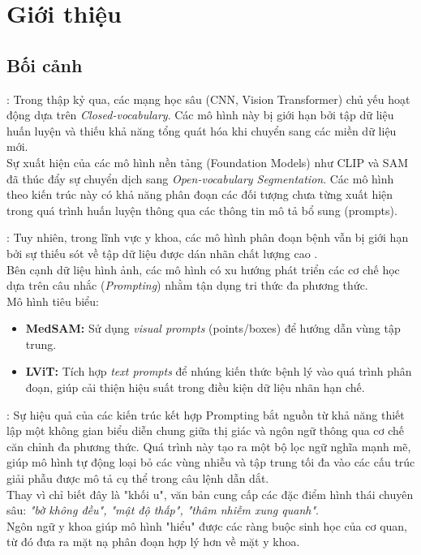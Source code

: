 \section{Giới thiệu}

\subsection{Bối cảnh}
\begin{frame}{\secname: \subsecname}
    Trong thập kỷ qua, các mạng học sâu (CNN, Vision Transformer) chủ yếu hoạt động dựa trên \textit{Closed-vocabulary}. Các mô hình này bị giới hạn bởi tập dữ liệu huấn luyện và thiếu khả năng tổng quát hóa khi chuyển sang các miền dữ liệu mới. \\
    Sự xuất hiện của các mô hình nền tảng (Foundation Models) như CLIP và SAM đã thúc đẩy sự chuyển dịch sang \textit{Open-vocabulary Segmentation}. Các mô hình theo kiến trúc này có khả năng phân đoạn các đối tượng chưa từng xuất hiện trong quá trình huấn luyện thông qua các thông tin mô tả bổ sung (prompts).
\end{frame}

\begin{frame}{\secname: \subsecname}
    Tuy nhiên, trong lĩnh vực y khoa, các mô hình phân đoạn bệnh vẫn bị giới hạn bởi sự thiếu sót về tập dữ liệu được dán nhãn chất lượng cao \cite{li_lvit_2023}. \\
    Bên cạnh dữ liệu hình ảnh, các mô hình có xu hướng phát triển các cơ chế học dựa trên câu nhắc (\textit{Prompting}) nhằm tận dụng tri thức đa phương thức. \\
    Mô hình tiêu biểu:
        \begin{itemize}
            \item \textbf{MedSAM:} Sử dụng \textit{visual prompts} (points/boxes) để hướng dẫn vùng tập trung.
            \item \textbf{LViT:} Tích hợp \textit{text prompts} để nhúng kiến thức bệnh lý vào quá trình phân đoạn, giúp cải thiện hiệu suất trong điều kiện dữ liệu nhãn hạn chế.
        \end{itemize}
\end{frame}

\begin{frame}{\secname: \subsecname}
    Sự hiệu quả của các kiến trúc kết hợp Prompting bắt nguồn từ khả năng thiết lập một không gian biểu diễn chung giữa thị giác và ngôn ngữ thông qua cơ chế căn chỉnh đa phương thức. Quá trình này tạo ra một bộ lọc ngữ nghĩa mạnh mẽ, giúp mô hình tự động loại bỏ các vùng nhiễu và tập trung tối đa vào các cấu trúc giải phẫu được mô tả cụ thể trong câu lệnh dẫn dắt. \\
    Thay vì chỉ biết đây là "khối u", văn bản cung cấp các đặc điểm hình thái chuyên sâu: \textit{"bờ không đều", "mật độ thấp", "thâm nhiễm xung quanh"}. \\
    Ngôn ngữ y khoa giúp mô hình "hiểu" được các ràng buộc sinh học của cơ quan, từ đó đưa ra mặt nạ phân đoạn hợp lý hơn về mặt y khoa.
\end{frame}

